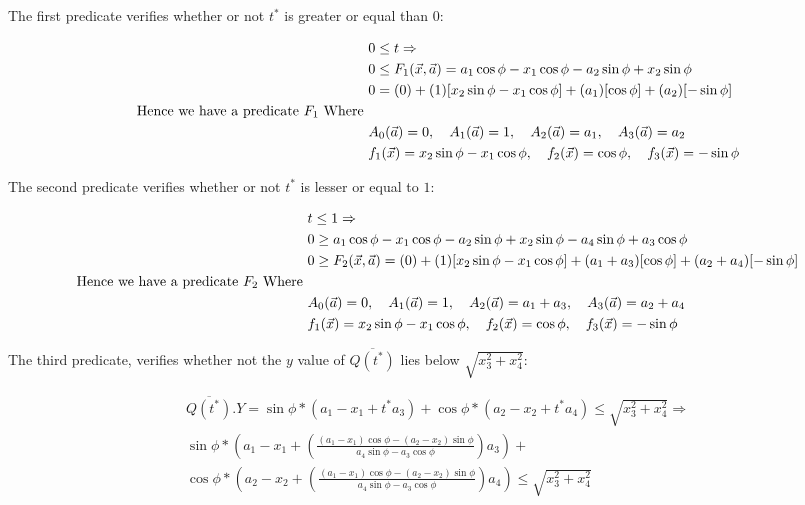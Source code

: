 \documentclass{article}
\begin{document}
The first predicate verifies whether or not $t^*$ is greater or equal than $0$:

\begin{align*}
    &0 \le t \Rightarrow \\
    &0 \le F_1(\vec{x}, \vec{a}) = a_1\cos \phi - x_1\cos \phi  - a_2\sin \phi + x_2\sin \phi  \\
    &0 = (0) + (1)[x_2 \sin \phi - x_1 \cos \phi] + (a_1) [ \cos \phi] + (a_2) [ - \sin \phi ] \\
    \textnormal{Hence we have a predicate } F_1 \textnormal{ Where }\\
    &A_0(\vec{a}) = 0, \quad A_1(\vec{a}) = 1,\quad A_2(\vec{a}) = a_1,\quad A_3(\vec{a}) = a_2 \\
    &f_1(\vec{x}) = x_2 \sin \phi - x_1 \cos \phi,\quad f_2(\vec{x}) = \cos \phi, \quad f_3(\vec{x}) = -\sin \phi
\end{align*}

The second predicate verifies whether or not $t^*$ is lesser or equal to $1$:

\begin{align*}
    &t \le 1 \Rightarrow \\
    &0  \ge a_1\cos \phi - x_1\cos \phi  - a_2\sin \phi + x_2\sin \phi - a_4 \sin \phi  + a_3 \cos \phi   \\
    &0 \ge F_2(\vec{x}, \vec{a}) = (0) + (1)[ x_2\sin \phi - x_1\cos \phi] + (a_1 + a_3) [ \cos \phi] + (a_2 + a_4)[- \sin \phi] \\
    \textnormal{Hence we have a predicate } F_2 \textnormal{ Where } \\
    &A_0(\vec{a}) = 0, \quad A_1(\vec{a}) = 1,\quad A_2(\vec{a}) = a_1 + a_3,\quad A_3(\vec{a}) = a_2 + a_4 \\
    &f_1(\vec{x}) = x_2 \sin \phi - x_1 \cos \phi,\quad f_2(\vec{x}) = \cos \phi, \quad f_3(\vec{x}) = -\sin \phi
\end{align*}

The third predicate, verifies whether not the $y$ value of $\overline{Q(t^*)}$ lies below $\sqrt{x_3^2 + x_4^2}$:

\begin{align*}
    \overline{Q(t^*)}.Y = \sin \phi * (a_1 - x_1 + t^* a_3) + \cos \phi  * (a_2 - x_2 + t^* a_4)  \le \sqrt{x_3^2 + x_4^2} \Rightarrow \\
     \sin \phi * (a_1 - x_1 + \left(\frac{ (a_1 - x_1)\cos \phi  - (a_2 - x_2)\sin \phi}{ a_4 \sin \phi -a_3 \cos \phi}\right) a_3) + \\
     \cos \phi  * (a_2 - x_2 + \left(\frac{ (a_1 - x_1)\cos \phi  - (a_2 - x_2)\sin \phi}{ a_4 \sin \phi -a_3 \cos \phi}\right) a_4) \le \sqrt{x_3^2 + x_4^2} 
\end{align*}
\end{document}
